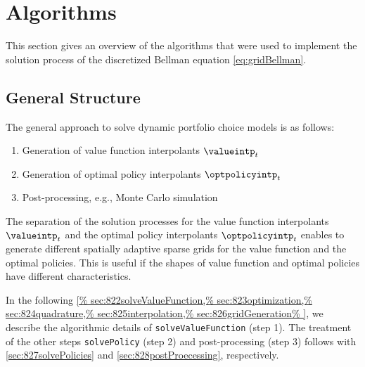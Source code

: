 \section{Algorithms}
\label{sec:82algorithms}


\noindent
This section gives an overview of the algorithms that
were used to implement the solution process of
the discretized Bellman equation \eqref{eq:gridBellman}.



\subsection{General Structure}
\label{sec:821generalStructure}

The general approach to solve dynamic portfolio choice models is as follows:
\begin{enumerate}
  \item
  Generation of value function interpolants $\valueintp_t$
  
  \item
  Generation of optimal policy interpolants $\optpolicyintp_t$
  
  \item
  Post-processing, e.g., Monte Carlo simulation
\end{enumerate}
The separation of the solution processes for
the value function interpolants $\valueintp_t$
and the optimal policy interpolants $\optpolicyintp_t$
enables to generate different spatially adaptive sparse grids
for the value function and the optimal policies.
This is useful if the shapes of value function and optimal policies
have different characteristics.

In the following \cref{%
  sec:822solveValueFunction,%
  sec:823optimization,%
  sec:824quadrature,%
  sec:825interpolation,%
  sec:826gridGeneration%
}, we describe the algorithmic details of
\texttt{solveValueFunction} (step 1).
The treatment of the other steps \texttt{solvePolicy} (step 2) and
post-processing (step 3) follows with
\cref{sec:827solvePolicies} and \cref{sec:828postProecessing},
respectively.


